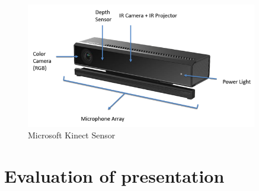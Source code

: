 \begin{figure}[htbp]
  \centering\includegraphics[width=0.9\textwidth]{./img/kinect.png}
\caption{Microsoft Kinect Sensor}\label{fig:kinect}
\end{figure}



\section{Evaluation of presentation}


